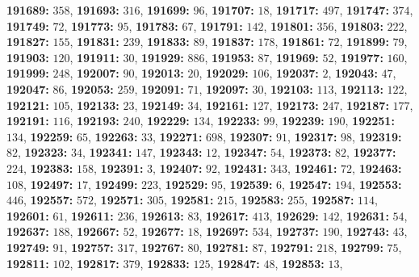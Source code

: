 \textsf{\bfseries 191689:} $358$, \textsf{\bfseries 191693:} $316$, \textsf{\bfseries 191699:} $96$, \textsf{\bfseries 191707:} $18$, \textsf{\bfseries 191717:} $497$, \textsf{\bfseries 191747:} $374$, \textsf{\bfseries 191749:} $72$, \textsf{\bfseries 191773:} $95$, \textsf{\bfseries 191783:} $67$, \textsf{\bfseries 191791:} $142$, \textsf{\bfseries 191801:} $356$, \textsf{\bfseries 191803:} $222$, \textsf{\bfseries 191827:} $155$, \textsf{\bfseries 191831:} $239$, \textsf{\bfseries 191833:} $89$, \textsf{\bfseries 191837:} $178$, \textsf{\bfseries 191861:} $72$, \textsf{\bfseries 191899:} $79$, \textsf{\bfseries 191903:} $120$, \textsf{\bfseries 191911:} $30$, \textsf{\bfseries 191929:} $886$, \textsf{\bfseries 191953:} $87$, \textsf{\bfseries 191969:} $52$, \textsf{\bfseries 191977:} $160$, \textsf{\bfseries 191999:} $248$, \textsf{\bfseries 192007:} $90$, \textsf{\bfseries 192013:} $20$, \textsf{\bfseries 192029:} $106$, \textsf{\bfseries 192037:} $2$, \textsf{\bfseries 192043:} $47$, \textsf{\bfseries 192047:} $86$, \textsf{\bfseries 192053:} $259$, \textsf{\bfseries 192091:} $71$, \textsf{\bfseries 192097:} $30$, \textsf{\bfseries 192103:} $113$, \textsf{\bfseries 192113:} $122$, \textsf{\bfseries 192121:} $105$, \textsf{\bfseries 192133:} $23$, \textsf{\bfseries 192149:} $34$, \textsf{\bfseries 192161:} $127$, \textsf{\bfseries 192173:} $247$, \textsf{\bfseries 192187:} $177$, \textsf{\bfseries 192191:} $116$, \textsf{\bfseries 192193:} $240$, \textsf{\bfseries 192229:} $134$, \textsf{\bfseries 192233:} $99$, \textsf{\bfseries 192239:} $190$, \textsf{\bfseries 192251:} $134$, \textsf{\bfseries 192259:} $65$, \textsf{\bfseries 192263:} $33$, \textsf{\bfseries 192271:} $698$, \textsf{\bfseries 192307:} $91$, \textsf{\bfseries 192317:} $98$, \textsf{\bfseries 192319:} $82$, \textsf{\bfseries 192323:} $34$, \textsf{\bfseries 192341:} $147$, \textsf{\bfseries 192343:} $12$, \textsf{\bfseries 192347:} $54$, \textsf{\bfseries 192373:} $82$, \textsf{\bfseries 192377:} $224$, \textsf{\bfseries 192383:} $158$, \textsf{\bfseries 192391:} $3$, \textsf{\bfseries 192407:} $92$, \textsf{\bfseries 192431:} $343$, \textsf{\bfseries 192461:} $72$, \textsf{\bfseries 192463:} $108$, \textsf{\bfseries 192497:} $17$, \textsf{\bfseries 192499:} $223$, \textsf{\bfseries 192529:} $95$, \textsf{\bfseries 192539:} $6$, \textsf{\bfseries 192547:} $194$, \textsf{\bfseries 192553:} $446$, \textsf{\bfseries 192557:} $572$, \textsf{\bfseries 192571:} $305$, \textsf{\bfseries 192581:} $215$, \textsf{\bfseries 192583:} $255$, \textsf{\bfseries 192587:} $114$, \textsf{\bfseries 192601:} $61$, \textsf{\bfseries 192611:} $236$, \textsf{\bfseries 192613:} $83$, \textsf{\bfseries 192617:} $413$, \textsf{\bfseries 192629:} $142$, \textsf{\bfseries 192631:} $54$, \textsf{\bfseries 192637:} $188$, \textsf{\bfseries 192667:} $52$, \textsf{\bfseries 192677:} $18$, \textsf{\bfseries 192697:} $534$, \textsf{\bfseries 192737:} $190$, \textsf{\bfseries 192743:} $43$, \textsf{\bfseries 192749:} $91$, \textsf{\bfseries 192757:} $317$, \textsf{\bfseries 192767:} $80$, \textsf{\bfseries 192781:} $87$, \textsf{\bfseries 192791:} $218$, \textsf{\bfseries 192799:} $75$, \textsf{\bfseries 192811:} $102$, \textsf{\bfseries 192817:} $379$, \textsf{\bfseries 192833:} $125$, \textsf{\bfseries 192847:} $48$, \textsf{\bfseries 192853:} $13$, 
